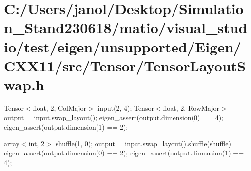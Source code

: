 \hypertarget{_c_1_2_users_2janol_2_desktop_2_simulation__stand230618_2matio_2visual_studio_2test_2eigen_2unsu859cb1af38ccde16e337b20b69d954c8}{}\section{C\+:/\+Users/janol/\+Desktop/\+Simulation\+\_\+\+Stand230618/matio/visual\+\_\+studio/test/eigen/unsupported/\+Eigen/\+C\+X\+X11/src/\+Tensor/\+Tensor\+Layout\+Swap.\+h}
Tensor$<$float, 2, Col\+Major$>$ input(2, 4); Tensor$<$float, 2, Row\+Major$>$ output = input.\+swap\+\_\+layout(); eigen\+\_\+assert(output.\+dimension(0) == 4); eigen\+\_\+assert(output.\+dimension(1) == 2);

array$<$int, 2$>$ shuffle(1, 0); output = input.\+swap\+\_\+layout().shuffle(shuffle); eigen\+\_\+assert(output.\+dimension(0) == 2); eigen\+\_\+assert(output.\+dimension(1) == 4);


